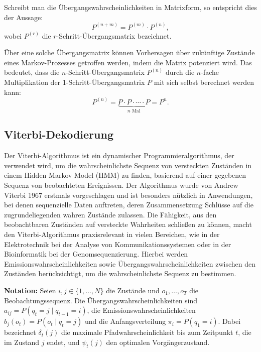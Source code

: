 Schreibt man die Übergangswahrscheinlichkeiten in Matrixform, so entspricht dies der Aussage:
\begin{equation}
P^{(n+m)} = P^{(m)} \cdot P^{(n)},
\end{equation}
wobei $P^{(r)}$ die $r$-Schritt-Übergangsmatrix bezeichnet.

Über eine solche Übergangsmatrix können Vorhersagen über zukünftige Zustände eines Markov-Prozesses getroffen werden, indem die Matrix potenziert wird.
Das bedeutet, dass die $n$-Schritt-Übergangsmatrix $P^{(n)}$ durch die $n$-fache Multiplikation der 1-Schritt-Übergangsmatrix $P$ mit sich selbst berechnet werden kann:
\begin{equation}
P^{(n)} = \underbrace{P \cdot P \cdot \cdots \cdot P}_{n \text{ Mal}} = P^n.
\end{equation} 


\subsection{Viterbi-Dekodierung}

Der Viterbi-Algorithmus ist ein dynamischer Programmieralgorithmus, der verwendet wird, um die wahrscheinlichste Sequenz von versteckten Zuständen in einem Hidden Markov Model (HMM) zu finden, basierend auf einer gegebenen Sequenz von beobachteten Ereignissen. Der Algorithmus wurde von Andrew Viterbi 1967 erstmals vorgeschlagen und ist besonders nützlich in Anwendungen, bei denen sequenzielle Daten auftreten, deren Zusammensetzung Schlüsse auf die zugrundeliegenden wahren Zustände zulassen. Die Fähigkeit, aus den beobachtbaren Zuständen auf versteckte Wahrheiten schließen zu können, macht den Viterbi-Algorithmus praxisrelevant in vielen Bereichen, wie in der Elektrotechnik bei der Analyse von Kommunikationssystemen oder in der Bioinformatik bei der Genomsequenzierung.
Hierbei werden Emissionswahrscheinlichkeiten sowie Übergangswahrscheinlichkeiten zwischen den Zuständen berücksichtigt, um die wahrscheinlichste Sequenz zu bestimmen.

\medskip
\textbf{Notation:} 
Seien $i, j \in \{1, \ldots, N\}$ die Zustände und $o_1, \ldots, o_T$ die Beobachtungssequenz.
Die Übergangswahrscheinlichkeiten sind $a_{ij} = P(q_t = j \mid q_{t-1} = i)$, 
die Emissionswahrscheinlichkeiten $b_j(o_t) = P(o_t \mid q_t = j)$ und 
die Anfangsverteilung $\pi_i = P(q_1 = i)$.
Dabei bezeichnet $\delta_t(j)$ die maximale Pfadwahrscheinlichkeit bis zum Zeitpunkt $t$, die im Zustand $j$ endet, 
und $\psi_t(j)$ den optimalen Vorgängerzustand.

